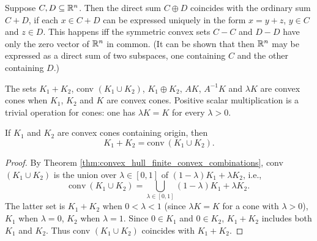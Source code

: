 \documentclass[11pt,a4paper]{article}
\begin{document}
\begin{remark}\label{remark:direct_sum_cartesian_product}
    Suppose $C,D\subseteq\mathbb{R}^n$. Then the direct sum $C\oplus D$ coincides with the ordinary sum $C+D$, if each $x\in C+D$ can be expressed uniquely in the form $x = y+z$, $y\in C$ and $z\in D$. This happens iff the symmetric convex sets $C-C$ and $D-D$ have only the zero vector of $\mathbb{R}^n$ in common. (It can be shown that then $\mathbb{R}^n$ may be expressed as a direct sum of two subspaces, one containing $C$ and the other containing $D$.)
\end{remark}


\begin{remark}
    The sets $K_1+K_2$, conv $(K_1\cup K_2)$, $K_1\oplus K_2$, $AK$, $A^{-1}K$ and $\lambda K$ are convex cones when $K_1$, $K_2$ and $K$ are convex cones. Positive scalar multiplication is a trivial operation for cones: one has $\lambda K = K$ for every $\lambda >0$.
\end{remark}

\begin{theorem}
    If $K_1$ and $K_2$ are convex cones containing origin, then
    \begin{equation*}
        K_1+K_2 = \text{conv}\ (K_1\cup K_2).
    \end{equation*} 
\end{theorem}

\begin{proof}
    By Theorem \ref{thm:convex_hull_finite_convex_combinations}, conv $(K_1\cup K_2)$ is the union over $\lambda\in [0,1]$ of $(1-\lambda)K_1 + \lambda K_2$, i.e.,
    \begin{equation*}
        \text{conv}\ (K_1\cup K_2) = \bigcup_{\lambda\in [0,1]} (1-\lambda)K_1 + \lambda K_2.
    \end{equation*}
    The latter set is $K_1+K_2$ when $0<\lambda<1$ (since $\lambda K = K$ for a cone with $\lambda>0$), $K_1$ when $\lambda = 0$, $K_2$ when $\lambda = 1$. Since $0\in K_1$ and $0\in K_2$, $K_1+K_2$ includes both $K_1$ and $K_2$. Thus conv $(K_1\cup K_2)$ coincides with $K_1+K_2$.
\end{proof}
\end{document}
